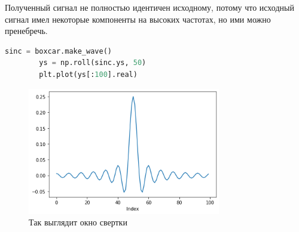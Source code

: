 \documentclass[a4paper, 12pt]{report}
\begin{document}
	Полученный сигнал не полностью идентичен исходному, потому что исходный сигнал имел некоторые компоненты на высоких частотах, но ими можно пренебречь.
	\begin{lstlisting}[language=Python,caption=Окно свертки]
		sinc = boxcar.make_wave()
		ys = np.roll(sinc.ys, 50)
		plt.plot(ys[:100].real)
	\end{lstlisting}
	\begin{figure}[H]
		\centering
		\includegraphics[width=0.75\textwidth]{samp15.png}
		\caption{Так выглядит окно свертки}
		\label{fig:samp15}
	\end{figure}
\end{document}
